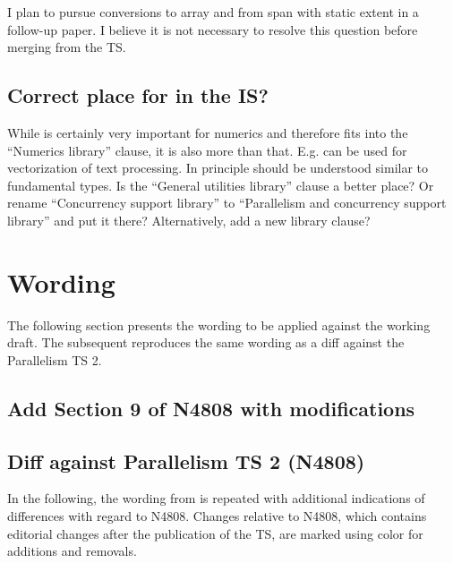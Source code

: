 I plan to pursue conversions to array and from span with static extent in a follow-up paper.
I believe it is not necessary to resolve this question before merging  from the TS.

\subsection{Correct place for  in the IS?}

While  is certainly very important for numerics and therefore fits into the “Numerics library” clause, it is also more than that.
E.g.  can be used for vectorization of text processing.
In principle  should be understood similar to fundamental types.
Is the “General utilities library” clause a better place?
Or rename “Concurrency support library” to “Parallelism and concurrency support library” and put it there?
Alternatively, add a new library clause?

\section{Wording}

The following section presents the wording to be applied against the \CC{} working draft.
The subsequent  reproduces the same wording as a diff against the Parallelism TS 2.

\subsection{Add Section 9 of N4808 with modifications}\label{sec:wording}

\begin{wgText}
  \def\wgRem#1{}
  \def\wgAdd#1{#1}
  \def\wgChange#1#2{#2}
  \setcounter{WGClause}{28}
  \setcounter{WGSubSection}{8}
  
\end{wgText}

\subsection{Diff against Parallelism TS 2 (N4808)}\label{sec:diff}

In the following, the wording from  is repeated with additional indications of differences with regard to N4808.
Changes relative to N4808, which contains editorial changes after the publication of the TS, are marked using color for \textcolor{WgAdd}{additions} and \textcolor{WgRem}{removals}.

\def\wgLabelPrefix{diff}%
\begin{wgText}
  \setcounter{WGClause}{28}
  \setcounter{WGSubSection}{8}
  
\end{wgText}


